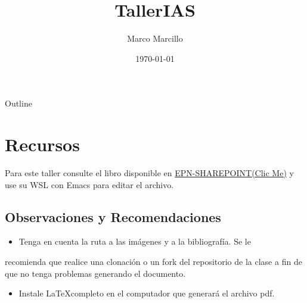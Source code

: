\documentclass{article}
\author{Marco Marcillo}
\date{\today}
\title{TallerIAS}
\begin{document}
\maketitle
\begin{frame}{Outline}
\tableofcontents
\end{frame}

\thispagestyle{fancy}


\section{Recursos}
\label{sec:org0e2ec63}
Para este taller consulte el libro 
disponible en \href{https://epnecuador-my.sharepoint.com/:f:/g/personal/lenin\_falconi\_epn\_edu\_ec/EgjH2RoedD5NuswqpOt8ExsB\_DE052v9Rlrg0QpEtbimDg?e=WoqexR}{EPN-SHAREPOINT(Clic Me)} y use su WSL con Emacs para editar el archivo.
\subsection{Observaciones y Recomendaciones}
\label{sec:orgaba6b63}
\begin{itemize}
\item Tenga en cuenta la ruta a las imágenes y a la bibliografía. Se le
\end{itemize}
recomienda que realice una clonación o un fork del repositorio de la
clase a fin de que no tenga problemas generando el documento.
\begin{itemize}
\item Instale \LaTeX completo en el computador que generará el archivo pdf.
\end{itemize}
\end{document}
